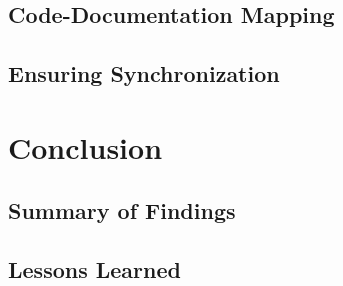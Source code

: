     \section{Code-Documentation Mapping}\label{sec:code-doc-mapping}
    \section{Ensuring Synchronization}\label{sec:synchronization}

\chapter{Conclusion}\label{chap:conclusion}
    \section{Summary of Findings}\label{sec:findings-summary}
    \section{Lessons Learned}\label{sec:lessons-learned}




